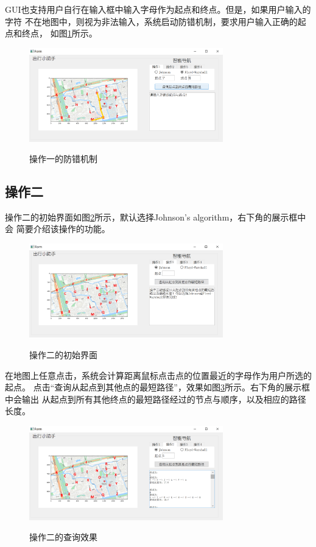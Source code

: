 \documentclass{article}
\begin{document}
GUI也支持用户自行在输入框中输入字母作为起点和终点。但是，如果用户输入的字符
不在地图中，则视为非法输入，系统启动防错机制，要求用户输入正确的起点和终点，
如图\ref{op1.error}所示。
\begin{figure}[H]
	\centering
	{\includegraphics[width=0.75\textwidth]{image//操作一纠错.png}} 
	\caption{操作一的防错机制} \label{op1.error}
\end{figure}

\subsection{操作二}
操作二的初始界面如图\ref{op2.init}所示，默认选择Johnson's algorithm，右下角的展示框中会
简要介绍该操作的功能。
\begin{figure}[H]
	\centering
	{\includegraphics[width=0.75\textwidth]{image//操作二初始界面.png}} 
	\caption{操作二的初始界面} \label{op2.init}
\end{figure}

在地图上任意点击，系统会计算距离鼠标点击点的位置最近的字母作为用户所选的起点。
点击“查询从起点到其他点的最短路径”，效果如图\ref{op2.result}所示。右下角的展示框中会输出
从起点到所有其他终点的最短路径经过的节点与顺序，以及相应的路径长度。
\begin{figure}[H]
	\centering
	{\includegraphics[width=0.75\textwidth]{image//操作二结果.png}} 
	\caption{操作二的查询效果} \label{op2.result}
\end{figure}
\end{document}
